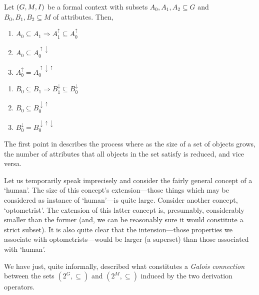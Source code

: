 \begin{proposition}
  \label{proposition:properties-about-derivation-operators}
  Let $(G,M,\mathrel{I})$ be a formal context with subsets $A_0, A_1, A_2 \subseteq G$ and $B_0, B_1, B_2 \subseteq M$ of attributes. Then,
  \vspace{-1em}
  \begin{center}
    \begin{minipage}[t]{0.48\textwidth}
      \begin{enumerate}
        \item $A_0 \subseteq A_1 \Rightarrow A_1^\uparrow \subseteq A_0^\uparrow$
        \item $A_0 \subseteq A_0^{\uparrow \downarrow}$
        \item $A_0^\uparrow = A_0^{\uparrow \downarrow \uparrow}$
      \end{enumerate}
    \end{minipage}%
    \hfill
    \begin{minipage}[t]{0.48\textwidth}
      \begin{enumerate}
        \item $B_0 \subseteq B_1 \Rightarrow B_1^\downarrow \subseteq B_0^\downarrow$
        \item $B_0 \subseteq B_0^{\downarrow \uparrow}$
        \item $B_0^\downarrow = B_0^{\downarrow \uparrow \downarrow}$
      \end{enumerate}
    \end{minipage}
  \end{center}
\end{proposition}

The first point in  describes the process where as the size of a set of objects grows, the number of attributes that all objects in the set satisfy is reduced, and vice versa.

Let us temporarily speak imprecisely and consider the fairly general concept of a `human'. The size of this concept's extension---those things which may be considered as instance of `human'---is quite large. Consider another concept, `optometrist'. The extension of this latter concept is, presumably, considerably smaller than the former (and, we can be reasonably sure it would constitute a strict subset). It is also quite clear that the intension---those properties we associate with optometrists---would be larger (a superset) than those associated with `human'.

We have just, quite informally, described what constitutes a \textit{Galois connection} between the sets $(2^G, \subseteq)$ and $(2^M, \subseteq)$ induced by the two derivation operators.

